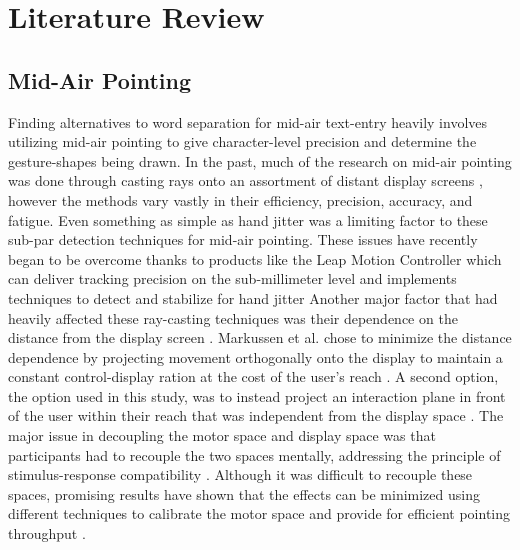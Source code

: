 \chapter{Literature Review}

\section{Mid-Air Pointing}
Finding alternatives to word separation for mid-air text-entry heavily involves utilizing mid-air pointing to give character-level precision and determine the gesture-shapes being drawn. In the past, much of the research on mid-air pointing was done through casting rays onto an assortment of distant display screens \cite{ref_large_display_pointing,ref_air_pointing,ref_ray_pointing_large_displays,ref_shadow_reaching,ref_freehand_pointing_large_displays,ref_large_screen_pointing_gestures}, however the methods vary vastly in their efficiency, precision, accuracy, and fatigue. Even something as simple as hand jitter was a limiting factor to these sub-par detection techniques for mid-air pointing. These issues have recently began to be overcome thanks to products like the Leap Motion Controller which can deliver tracking precision on the sub-millimeter level and implements techniques to detect and stabilize for hand jitter \cite{ref_leap_device_evaluation_1,ref_leap_device_evaluation_2} Another major factor that had heavily affected these ray-casting techniques was their dependence on the distance from the display screen \cite{ref_mid_air_text_large_displays}. Markussen et al. chose to minimize the distance dependence by projecting movement orthogonally onto the display to maintain a constant control-display ration at the cost of the user's reach \cite{ref_selection_based_mid_air}. A second option, the option used in this study, was to instead project an interaction plane in front of the user within their reach that was independent from the display space \cite{ref_alvin_thesis,ref_darren_thesis,ref_leap_pointing_device}. The major issue in decoupling the motor space and display space was that participants had to recouple the two spaces mentally, addressing the principle of stimulus-response compatibility \cite{ref_vulture,ref_stimulus_response_compatibility}. Although it was difficult to recouple these spaces, promising results have shown that the effects can be minimized using different techniques to calibrate the motor space and provide for efficient pointing throughput \cite{ref_alvin_thesis,ref_darren_thesis}.

